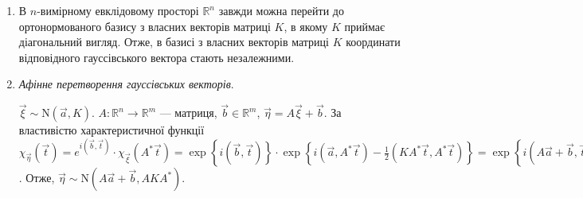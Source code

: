 \begin{enumerate}
\begin{proof}
        Якщо координати некорельовані, то кореляційна матриця $K = \mathrm{diag}(\sigma_1^2, \sigma_2^2, ..., \sigma_n^2)$.
        Тоді $\left( K \vec{t}, \vec{t}\right) = \sum_{k=1}^n \sigma_k^2 t_k^2$.
        Тоді $\chi_{\vec{\xi}}(\vec{t}) = \exp\left\{i(\vec{a}, \vec{t}) - \frac{1}{2}\left( K \vec{t}, \vec{t}\right)\right\} = \prod\limits_{k=1}^n e^{i a_k t_k - \frac{1}{2}\sigma_k^2 t_k^2} = \prod\limits_{k=1}^n \chi_{\xi_k}(t_k)$
        і координати незалежні.
    \end{proof}
    \item В $n$-вимірному евклідовому просторі $\mathbb{R}^n$ завжди можна перейти до
    ортонормованого базису з власних векторів матриці $K$, в якому $K$ приймає діагональний вигляд.
    Отже, в базисі з власних векторів матриці $K$ координати відповідного гауссівського вектора стають незалежними.
    \item \emph{Афінне перетворення гауссівських векторів}.

    $\vec{\xi} \sim \mathrm{N}(\vec{a}, K)$. $A : \mathbb{R}^n \rightarrow \mathbb{R}^m$ --- матриця, $\vec{b} \in \mathbb{R}^m$, $\vec{\eta} = A\vec{\xi} + \vec{b}$.
    За властивістю характеристичної функції $\chi_{\vec{\eta}}(\vec{t}) = e^{i(\vec{b}, \vec{t})}\cdot\chi_{\vec{\xi}}(A^{*}\vec{t}) =
    \exp\left\{i(\vec{b}, \vec{t})\right\}\cdot \exp\left\{i(\vec{a}, A^{*}\vec{t}) - \frac{1}{2}\left( K A^{*}\vec{t}, A^{*}\vec{t}\right)\right\} =
    \exp\left\{i(A\vec{a} + \vec{b}, \vec{t}) - \frac{1}{2}\left( A K A^{*}\vec{t}, \vec{t}\right)\right\}$. Отже, $\vec{\eta} \sim \mathrm{N}(A\vec{a} + \vec{b}, A K A^{*})$.
\end{enumerate}
